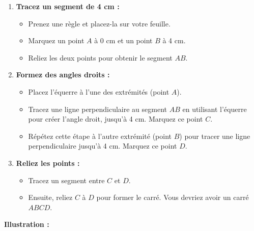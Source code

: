 \documentclass{article}
\begin{document}
\begin{enumerate}
    \item \textbf{Tracez un segment de 4 cm :}
    \begin{itemize}
        \item Prenez une règle et placez-la sur votre feuille.
        \item Marquez un point \(A\) à 0 cm et un point \(B\) à 4 cm.
        \item Reliez les deux points pour obtenir le segment \(AB\).
    \end{itemize}

    \item \textbf{Formez des angles droits :}
    \begin{itemize}
        \item Placez l'équerre à l'une des extrémités (point \(A\)).
        \item Tracez une ligne perpendiculaire au segment \(AB\) en utilisant l'équerre pour créer l'angle droit, jusqu'à 4 cm. Marquez ce point \(C\).
        \item Répétez cette étape à l'autre extrémité (point \(B\)) pour tracer une ligne perpendiculaire jusqu'à 4 cm. Marquez ce point \(D\).
    \end{itemize}

    \item \textbf{Reliez les points :}
    \begin{itemize}
        \item Tracez un segment entre \(C\) et \(D\).
        \item Ensuite, reliez \(C\) à \(D\) pour former le carré. Vous devriez avoir un carré \(ABCD\).
    \end{itemize}
\end{enumerate}

\textbf{Illustration :}
\begin{tcolorbox}[colback=blue!10!white, colframe=blue!75!black, title=\textcolor{white}{Illustration}, sharp corners=south]
    \begin{center}
    \end{center}
\end{tcolorbox}
\end{document}

